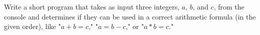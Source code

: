  \label{sssec:ex1_26}

Write a short program that takes as input three integers, $a$, $b$, and $c$, from the console and determines if they can be used in a correct arithmetic formula (in the given order), like "$a+b = c$," "$a = b-c$," or "$a \ast b = c$."

